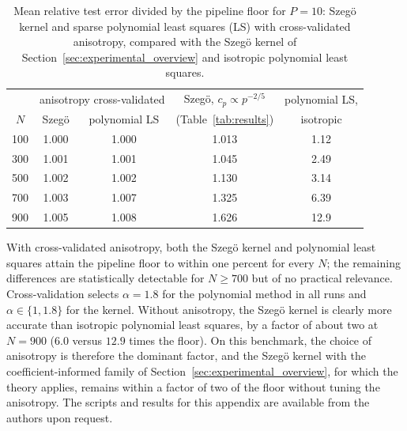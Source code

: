\documentclass[11pt]{article}
\numberwithin{equation}{section}
\theoremstyle{plain}
\theoremstyle{definition}
\theoremstyle{remark}
\begin{document}
\begin{table}[htbp]
\centering
\begin{tabular}{c|cc|cc}
\toprule
 & \multicolumn{2}{c|}{anisotropy cross-validated} & Szegö, $c_p\propto p^{-2/5}$ & polynomial LS,\\
$N$ & Szegö & polynomial LS & (Table~\ref{tab:results}) & isotropic\\
\midrule
100 & 1.000 & 1.000 & 1.013 & 1.12\\
300 & 1.001 & 1.001 & 1.045 & 2.49\\
500 & 1.002 & 1.002 & 1.130 & 3.14\\
700 & 1.003 & 1.007 & 1.325 & 6.39\\
900 & 1.005 & 1.008 & 1.626 & 12.9\\
\bottomrule
\end{tabular}
\caption{Mean relative test error divided by the pipeline floor for $P=10$: Szegö kernel and
sparse polynomial least squares (LS) with cross-validated anisotropy, compared with the
Szegö kernel of Section~\ref{sec:experimental_overview} and isotropic polynomial least
squares.}
\label{tab:poly}
\end{table}

With cross-validated anisotropy, both the Szegö kernel and polynomial least squares attain
the pipeline floor to within one percent for every $N$; the remaining differences are
statistically detectable for $N\geq700$ but of no practical relevance. Cross-validation
selects $\alpha=1.8$ for the polynomial method in all runs and $\alpha\in\{1,1.8\}$ for the
kernel. Without anisotropy, the Szegö kernel is clearly more accurate than isotropic
polynomial least squares, by a factor of about two at $N=900$ ($6.0$ versus $12.9$ times
the floor). On this benchmark, the choice of anisotropy is therefore the dominant factor,
and the Szegö kernel with the coefficient-informed family of
Section~\ref{sec:experimental_overview}, for which the theory applies, remains within a
factor of two of the floor without tuning the anisotropy. The scripts and results for this
appendix are available from the authors upon request.



\end{document}
